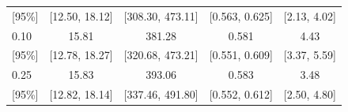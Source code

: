 \documentclass[11pt]{article}
\begin{document}
\begin{table}[H]
\begin{tabular}{lcccc}
\multicolumn{1}{r}{\footnotesize [95\%]} & \footnotesize [12.50, 18.12] & \footnotesize [308.30, 473.11] & \footnotesize [0.563, 0.625] & \footnotesize [2.13, 4.02] \\
0.10 & 15.81 & 381.28 & 0.581 & 4.43 \\
\multicolumn{1}{r}{\footnotesize [95\%]} & \footnotesize [12.78, 18.27] & \footnotesize [320.68, 473.21] & \footnotesize [0.551, 0.609] & \footnotesize [3.37, 5.59] \\
0.25 & 15.83 & 393.06 & 0.583 & 3.48 \\
\multicolumn{1}{r}{\footnotesize [95\%]} & \footnotesize [12.82, 18.14] & \footnotesize [337.46, 491.80] & \footnotesize [0.552, 0.612] & \footnotesize [2.50, 4.80] \\
\bottomrule
\end{tabular}
\end{table}
\end{document}
